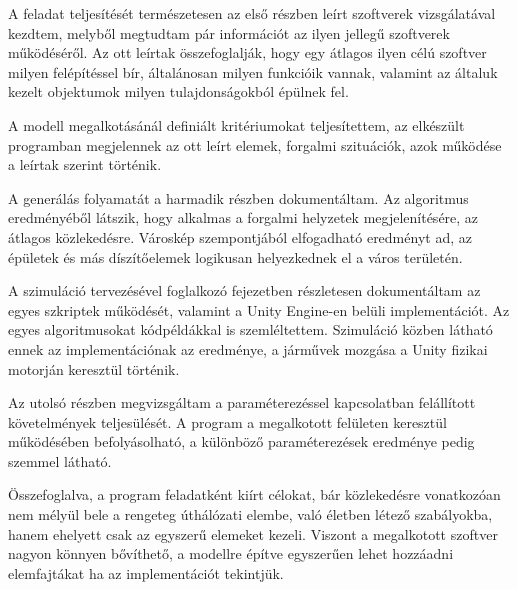 
A feladat teljesítését természetesen az első részben leírt szoftverek vizsgálatával kezdtem, melyből megtudtam pár információt az ilyen jellegű szoftverek működéséről. Az ott leírtak összefoglalják, hogy egy átlagos ilyen célú szoftver milyen felépítéssel bír, általánosan milyen funkcióik vannak, valamint az általuk kezelt objektumok milyen tulajdonságokból épülnek fel.

A modell megalkotásánál definiált kritériumokat teljesítettem, az elkészült programban megjelennek az ott leírt elemek, forgalmi szituációk, azok működése a leírtak szerint történik.

A generálás folyamatát a harmadik részben dokumentáltam. Az algoritmus eredményéből látszik, hogy alkalmas a forgalmi helyzetek megjelenítésére, az átlagos közlekedésre. Városkép szempontjából elfogadható eredményt ad, az épületek és más díszítőelemek logikusan helyezkednek el a város területén.

A szimuláció tervezésével foglalkozó fejezetben részletesen dokumentáltam az egyes szkriptek működését, valamint a Unity Engine-en belüli implementációt. Az egyes algoritmusokat kódpéldákkal is szemléltettem. Szimuláció közben látható ennek az implementációnak az eredménye, a járművek mozgása a Unity fizikai motorján keresztül történik.

Az utolsó részben megvizsgáltam a paraméterezéssel kapcsolatban felállított követelmények teljesülését. A program a megalkotott felületen keresztül működésében befolyásolható, a különböző paraméterezések eredménye pedig szemmel látható.

Összefoglalva, a program feladatként kiírt célokat, bár közlekedésre vonatkozóan nem mélyül bele a rengeteg úthálózati elembe, való életben létező szabályokba, hanem ehelyett csak az egyszerű elemeket kezeli. Viszont a megalkotott szoftver nagyon könnyen bővíthető, a modellre építve egyszerűen lehet hozzáadni elemfajtákat ha az implementációt tekintjük.